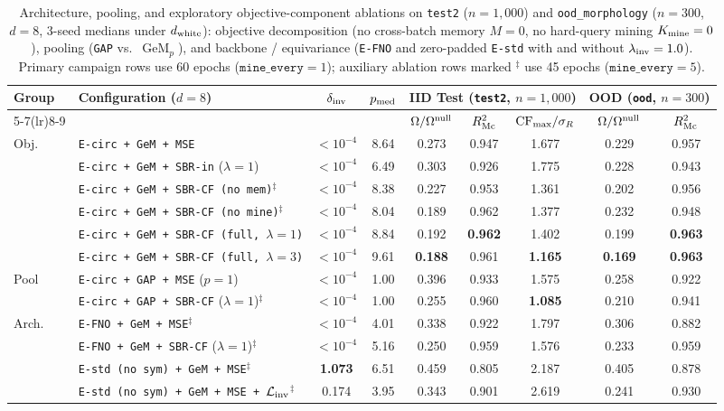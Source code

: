 \documentclass[preprint,11pt,a4paper]{elsarticle}
\newcommand{\GeM}{\operatorname{GeM}}
\begin{document}
\begin{table}[ht!]
\centering
\caption{Architecture, pooling, and exploratory objective-component ablations on \texttt{test2} ($n=1{,}000$) and \texttt{ood\_morphology} ($n=300$, $d=8$, 3-seed medians under $d_{\rm white}$): objective decomposition (no cross-batch memory $M=0$, no hard-query mining $K_{\rm mine}=0$), pooling (\texttt{GAP} vs.\ $\GeM_p$), and backbone / equivariance (\texttt{E-FNO} and zero-padded \texttt{E-std} with and without $\lambda_{\rm inv}=1.0$). Primary campaign rows use 60 epochs ($\texttt{mine\_every}=1$); auxiliary ablation rows marked $^\ddagger$ use 45 epochs ($\texttt{mine\_every}=5$).}
\label{tab:ablations_phase3}
\footnotesize
\setlength{\tabcolsep}{3.0pt}
\begin{tabular}{llccccccc}
\toprule
Group & Configuration ($d=8$) & $\delta_{\rm inv}$ & $p_{\rm med}$ & \multicolumn{3}{c}{IID Test (\texttt{test2}, $n=1{,}000$)} & \multicolumn{2}{c}{OOD (\texttt{ood}, $n=300$)} \\
\cmidrule(lr){5-7}\cmidrule(lr){8-9}
 & & & & $\Omega/\Omega^{\rm null}$ & $R^2_{\rm Mc}$ & ${\rm CF}_{\max}/\sigma_R$ & $\Omega/\Omega^{\rm null}$ & $R^2_{\rm Mc}$ \\
\midrule
Obj.
 & \texttt{E-circ + GeM + MSE} & $<10^{-4}$ & 8.64 & 0.273 & 0.947 & 1.677 & 0.229 & 0.957 \\
 & \texttt{E-circ + GeM + SBR-in} ($\lambda=1$) & $<10^{-4}$ & 6.49 & 0.303 & 0.926 & 1.775 & 0.228 & 0.943 \\
 & \texttt{E-circ + GeM + SBR-CF (no mem)}$^\ddagger$ & $<10^{-4}$ & 8.38 & 0.227 & 0.953 & 1.361 & 0.202 & 0.956 \\
 & \texttt{E-circ + GeM + SBR-CF (no mine)}$^\ddagger$ & $<10^{-4}$ & 8.04 & 0.189 & 0.962 & 1.377 & 0.232 & 0.948 \\
 & \texttt{E-circ + GeM + SBR-CF (full, $\lambda=1$)} & $<10^{-4}$ & 8.84 & 0.192 & \textbf{0.962} & 1.402 & 0.199 & \textbf{0.963} \\
 & \texttt{E-circ + GeM + SBR-CF (full, $\lambda=3$)} & $<10^{-4}$ & 9.61 & \textbf{0.188} & 0.961 & \textbf{1.165} & \textbf{0.169} & \textbf{0.963} \\
\midrule
Pool
 & \texttt{E-circ + GAP + MSE} ($p=1$) & $<10^{-4}$ & 1.00 & 0.396 & 0.933 & 1.575 & 0.258 & 0.922 \\
 & \texttt{E-circ + GAP + SBR-CF} ($\lambda=1$)$^\ddagger$ & $<10^{-4}$ & 1.00 & 0.255 & 0.960 & \textbf{1.085} & 0.210 & 0.941 \\
\midrule
Arch.
 & \texttt{E-FNO + GeM + MSE}$^\ddagger$ & $<10^{-4}$ & 4.01 & 0.338 & 0.922 & 1.797 & 0.306 & 0.882 \\
 & \texttt{E-FNO + GeM + SBR-CF} ($\lambda=1$)$^\ddagger$ & $<10^{-4}$ & 5.16 & 0.250 & 0.959 & 1.576 & 0.233 & 0.959 \\
 & \texttt{E-std (no sym) + GeM + MSE}$^\ddagger$ & \textbf{1.073} & 6.51 & 0.459 & 0.805 & 2.187 & 0.405 & 0.878 \\
 & \texttt{E-std (no sym) + GeM + MSE + $\mathcal L_{\rm inv}$}$^\ddagger$ & 0.174 & 3.95 & 0.343 & 0.901 & 2.619 & 0.241 & 0.930 \\
\bottomrule
\end{tabular}
\end{table}
\end{document}
